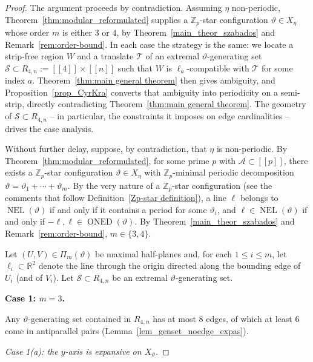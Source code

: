 \documentclass[12pt]{amsart}
\numberwithin{equation}{section}
\DeclareMathOperator{\nexpl}{NEL}
\DeclareMathOperator{\nexpd}{ONED}
\newcommand{\bb}[1]{\mathbb{#1}}
\newcommand{\llb}{[\![}
\newcommand{\rrb}{]\!]}
\begin{document}
\begin{proof}
The argument proceeds by contradiction. Assuming $\eta$ non-periodic,
Theorem~\ref{thm:modular_reformulated} supplies a $\bb{Z}_p$-star
configuration $\vartheta \in X_\eta$ whose order $m$ is either $3$ or $4$,
by Theorem~\ref{main_theor_szabados} and Remark~\ref{rem:order-bound}.
In each case the strategy is the same: we locate a strip-free region $W$
and a translate $\mathcal{T}$ of an extremal $\vartheta$-generating set
$\mathcal{S} \subset R_{4,n} :=  \llb 4 \rrb \times \llb n \rrb $ such that $W$ is $\pmb{\ell}_a$-compatible
with $\mathcal{T}$ for some index $a$. Theorem~\ref{thm:main general theorem}
then gives ambiguity, and Proposition~\ref{prop_CyrKra} converts that
ambiguity into periodicity on a semi-strip, directly contradicting
Theorem~\ref{thm:main general theorem}. The geometry of $\mathcal{S}
\subset R_{4,n}$ -- in particular, the constraints it imposes on edge
cardinalities -- drives the case analysis.

Without further delay, suppose, by contradiction, that $\eta$ is non-periodic. By
Theorem~\ref{thm:modular_reformulated}, for some prime $p$ with
$\mathcal{A} \subset \llb p \rrb$, there exists a $\bb{Z}_p$-star
configuration $\vartheta \in X_{\eta}$ with $\bb{Z}_p$-minimal periodic
decomposition $\vartheta = \vartheta_1+\cdots+\vartheta_m$.
By the very nature of a $\bb{Z}_p$-star configuration (see the comments 
that follow Definition~\ref{Zp-star definition}), a line $\ell$ belongs to
$\nexpl(\vartheta)$ if and only if it contains a period for some
$\vartheta_i$, and $\ell \in \nexpl(\vartheta)$ if and only if
$-\pmb{\ell}, \pmb{\ell} \in \nexpd(\vartheta)$.
By Theorem~\ref{main_theor_szabados} and Remark~\ref{rem:order-bound},
$m \in \{3,4\}$.

Let $(U,V) \in \Pi_m(\vartheta)$ be maximal half-planes and, for each
$1 \le i \le m$, let $\ell_i \subset \bb{R}^2$ denote the line through
the origin directed along the bounding edge of $U_i$ (and of $V_i$).
Let $\mathcal{S} \subset R_{4,n} $ be an extremal $\vartheta$-generating set.

\medbreak

\textbf{Case 1: $m = 3$.}

\medbreak

Any $\vartheta$-generating set contained in $R_{4,n}$ has at most $8$
edges, of which at least $6$ come in antiparallel pairs
(Lemma~\ref{lem_genset_noedge_expas}). 

\medskip

\textit{Case 1(a): the $y$-axis is expansive on $X_{\vartheta}$.}


\end{proof}
\end{document}
